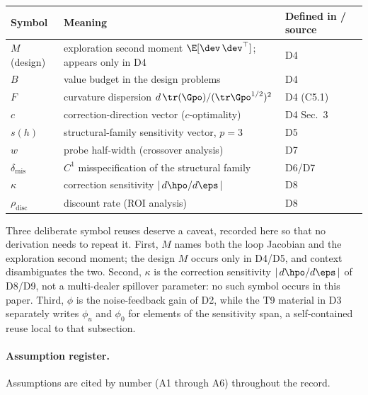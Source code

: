 \begin{center}\small
\begin{tabular}{@{}lp{4.9cm}l@{}}
\hline
Symbol & Meaning & Defined in / source\\
\hline
$M$ (design) & exploration second moment $\E[\dev\,\dev^\top]$;
  appears only in D4 & D4\\
$B$ & value budget in the design problems & D4\\
$F$ & curvature dispersion
  $d\,\tr(\Gpo)/(\tr \Gpo^{1/2})^2$ & D4 (C5.1)\\
$c$ & correction-direction vector ($c$-optimality) & D4 Sec.~3\\
$s(h)$ & structural-family sensitivity vector, $p = 3$ & D5\\
$w$ & probe half-width (crossover analysis) & D7\\
$\delta_{\mathrm{mis}}$ & $C^1$ misspecification of the
  structural family & D6/D7\\
$\kappa$ & correction sensitivity
  $\lvert\, d\hpo/d\eps \,\rvert$ & D8\\
$\rho_{\mathrm{disc}}$ & discount rate (ROI analysis) & D8\\
\hline
\end{tabular}
\end{center}

Three deliberate symbol reuses deserve a caveat, recorded here so that no
derivation needs to repeat it. First, $M$ names both the loop Jacobian and
the exploration second moment; the design $M$ occurs only in D4/D5, and
context disambiguates the two. Second, $\kappa$ is the correction
sensitivity $\lvert\, d\hpo/d\eps \,\rvert$ of D8/D9, not a multi-dealer
spillover parameter: no such symbol occurs in this paper. Third, $\phi$ is
the noise-feedback gain of D2, while the T9 material in D3 separately
writes $\phi_u$ and $\phi_0$ for elements of the sensitivity span, a
self-contained reuse local to that subsection.

\paragraph{Assumption register.}
Assumptions are cited by number (A1 through A6) throughout the record.

